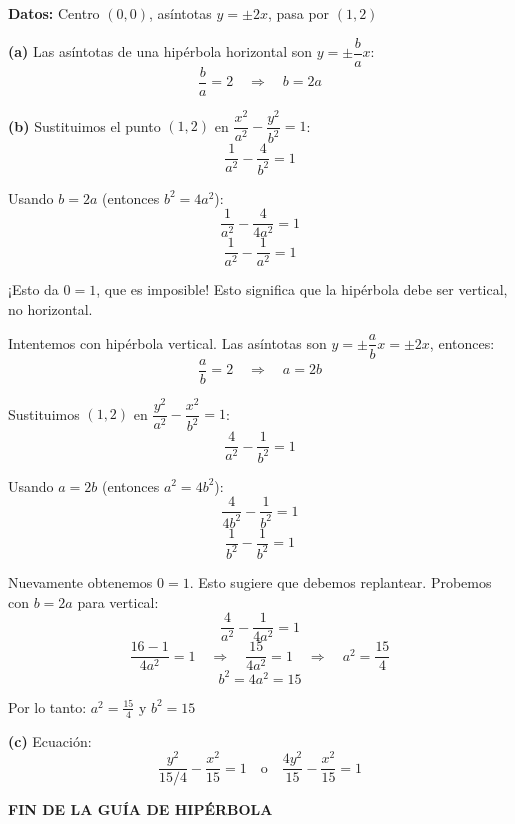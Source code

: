 \documentclass[12pt,a4paper]{article}
\begin{document}
	\textbf{Datos:} Centro $(0,0)$, asíntotas $y=\pm 2x$, pasa por $(1,2)$

	\bigskip

	\textbf{(a)} Las asíntotas de una hipérbola horizontal son $y=\pm\dfrac{b}{a}x$:
	\[
	\frac{b}{a}=2 \quad\Rightarrow\quad \boxed{b=2a}
	\]

	\textbf{(b)} Sustituimos el punto $(1,2)$ en $\dfrac{x^2}{a^2}-\dfrac{y^2}{b^2}=1$:
	\[
	\frac{1}{a^2}-\frac{4}{b^2}=1
	\]

	Usando $b=2a$ (entonces $b^2=4a^2$):
	\[
	\frac{1}{a^2}-\frac{4}{4a^2}=1
	\]
	\[
	\frac{1}{a^2}-\frac{1}{a^2}=1
	\]

	¡Esto da $0=1$, que es imposible! Esto significa que la hipérbola debe ser vertical, no horizontal.

	\bigskip

	Intentemos con hipérbola vertical. Las asíntotas son $y=\pm\dfrac{a}{b}x=\pm 2x$, entonces:
	\[
	\frac{a}{b}=2 \quad\Rightarrow\quad a=2b
	\]

	Sustituimos $(1,2)$ en $\dfrac{y^2}{a^2}-\dfrac{x^2}{b^2}=1$:
	\[
	\frac{4}{a^2}-\frac{1}{b^2}=1
	\]

	Usando $a=2b$ (entonces $a^2=4b^2$):
	\[
	\frac{4}{4b^2}-\frac{1}{b^2}=1
	\]
	\[
	\frac{1}{b^2}-\frac{1}{b^2}=1
	\]

	Nuevamente obtenemos $0=1$. Esto sugiere que debemos replantear. Probemos con $b=2a$ para vertical:
	\[
	\frac{4}{a^2}-\frac{1}{4a^2}=1
	\]
	\[
	\frac{16-1}{4a^2}=1 \quad\Rightarrow\quad \frac{15}{4a^2}=1 \quad\Rightarrow\quad a^2=\frac{15}{4}
	\]
	\[
	b^2=4a^2=15
	\]

	Por lo tanto: $\boxed{a^2=\frac{15}{4}\text{ y }b^2=15}$

	\textbf{(c)} Ecuación:
	\[
	\boxed{\frac{y^2}{15/4}-\frac{x^2}{15}=1}\quad\text{o}\quad\boxed{\frac{4y^2}{15}-\frac{x^2}{15}=1}
	\]

	\bigskip
	\bigskip

	\begin{center}
		\textbf{FIN DE LA GUÍA DE HIPÉRBOLA}
	\end{center}
\end{document}
